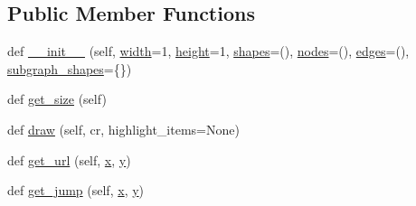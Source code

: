 \subsection*{Public Member Functions}
\begin{DoxyCompactItemize}
\item 
def \hyperlink{classsmacc__viewer_1_1xdot_1_1xdot__qt_1_1Graph_a1fd9dd208d52c8d3ce0d3b1e68a6ee26}{\+\_\+\+\_\+init\+\_\+\+\_\+} (self, \hyperlink{classsmacc__viewer_1_1xdot_1_1xdot__qt_1_1Graph_a7bdb10b7732ab166ccf02997593e0a99}{width}=1, \hyperlink{classsmacc__viewer_1_1xdot_1_1xdot__qt_1_1Graph_a4cad77b2943cc64a83492fe2f11fd799}{height}=1, \hyperlink{classsmacc__viewer_1_1xdot_1_1xdot__qt_1_1Graph_ab492d3c89dcaa21da68d806f0a319500}{shapes}=(), \hyperlink{classsmacc__viewer_1_1xdot_1_1xdot__qt_1_1Graph_ac698552cd98ca56471f189938d2a7237}{nodes}=(), \hyperlink{classsmacc__viewer_1_1xdot_1_1xdot__qt_1_1Graph_ae40379a0c30a3797a7db037038fea76d}{edges}=(), \hyperlink{classsmacc__viewer_1_1xdot_1_1xdot__qt_1_1Graph_a8470442e6098163b766e6c8a1326c7b6}{subgraph\+\_\+shapes}=\{\})
\item 
def \hyperlink{classsmacc__viewer_1_1xdot_1_1xdot__qt_1_1Graph_a5f79e2159b1e7219a303978bb021dd14}{get\+\_\+size} (self)
\item 
def \hyperlink{classsmacc__viewer_1_1xdot_1_1xdot__qt_1_1Graph_a7122415c118be7eaaaac9bb4bead52ca}{draw} (self, cr, highlight\+\_\+items=None)
\item 
def \hyperlink{classsmacc__viewer_1_1xdot_1_1xdot__qt_1_1Graph_ae71ca0801cf5b1852f0024eb81644739}{get\+\_\+url} (self, \hyperlink{namespacesmacc__viewer_1_1xdot_1_1xdot__qt_a1dd3d4e1f636ed9ebbed9b32d4c196df}{x}, \hyperlink{namespacesmacc__viewer_1_1xdot_1_1xdot__qt_a784c76c541d5dd5940e217a1aa54f256}{y})
\item 
def \hyperlink{classsmacc__viewer_1_1xdot_1_1xdot__qt_1_1Graph_a9bd837b153e437346b35c5b0e36fd0ad}{get\+\_\+jump} (self, \hyperlink{namespacesmacc__viewer_1_1xdot_1_1xdot__qt_a1dd3d4e1f636ed9ebbed9b32d4c196df}{x}, \hyperlink{namespacesmacc__viewer_1_1xdot_1_1xdot__qt_a784c76c541d5dd5940e217a1aa54f256}{y})
\end{DoxyCompactItemize}
